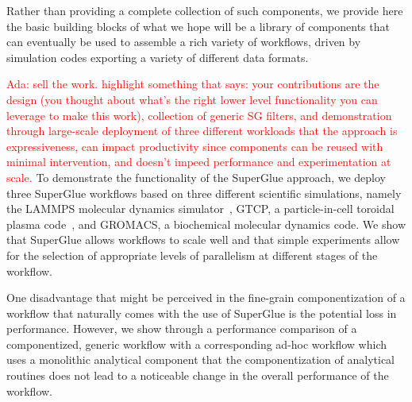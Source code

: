 \documentclass[conference]{IEEEtran}
\newcommand{\ada}[1]{\textcolor{red}{Ada: #1}}
\begin{document}
Rather than providing a complete collection of such components,
we provide here the basic building
blocks of what we hope will be a library of components that can
eventually be used to assemble
a rich variety of workflows, driven by simulation codes
exporting a variety of different data formats.

\ada{sell the work. highlight something that says: your contributions are the design (you thought
  about what's the right lower level functionality you can leverage to
  make this work), collection of generic SG filters, and demonstration
through large-scale deployment of three different workloads that the
approach is 
expressiveness, can impact productivity since components can be reused
with minimal intervention, and doesn't impeed performance and
experimentation at scale. }
\fi
To demonstrate the functionality of the SuperGlue approach,
we deploy three SuperGlue workflows based on three different
scientific simulations,
namely the LAMMPS molecular dynamics simulator~\cite{plimpton:1997:lammps},
GTCP, a particle-in-cell toroidal plasma code~\cite{lin:gtc},
and GROMACS, a biochemical molecular dynamics code\cite{hess2008gromacs}.
We show that SuperGlue allows workflows to scale well and that
simple experiments allow for the selection of
appropriate levels of parallelism at different
stages of the workflow.

One disadvantage that might be perceived in the fine-grain componentization
of a workflow that naturally comes with the use of SuperGlue
is the potential loss in performance.
However, we show through a performance comparison of
a componentized, generic workflow with a corresponding
ad-hoc workflow which uses a monolithic analytical component
that the componentization of analytical routines
does not lead to a noticeable change in the
overall performance of the workflow.


\end{document}
